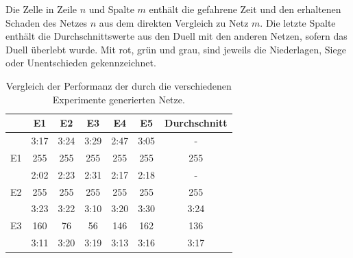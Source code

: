 \documentclass[11pt,final,journal,a4paper,towside,towcolumn]{IEEEtran}
\begin{document}
\begin{table}
	\caption{Vergleich der Performanz der durch die verschiedenen Experimente generierten Netze.}{Die Zelle in Zeile $n$ und Spalte $m$ enthält die gefahrene Zeit und den erhaltenen Schaden des Netzes $n$ aus dem direkten Vergleich zu Netz $m$. Die letzte Spalte enthält die Durchschnittswerte aus den Duell mit den anderen Netzen, sofern das Duell überlebt wurde. Mit rot, grün und grau, sind jeweils die Niederlagen, Siege oder Unentschieden gekennzeichnet.}
	\label{tab:turnier}
	\centering
	\begin{tabular}{|c|c|c|c|c|c|c|}
		\hline
		& E1                                                   & E2                            & E3                            & E4                            & E5                            & Durchschnitt \\ \hline
		& \cellcolor[HTML]{C0C0C0} 3:17 & \cellcolor[HTML]{C0C0C0}3:24 & \cellcolor[HTML]{FFCCC9}3:29 & \cellcolor[HTML]{FFCCC9}2:47 & \cellcolor[HTML]{FFCCC9}3:05 & \cellcolor[HTML]{C0C0C0}-       \\ \cline{2-7} 
		\multirow{-2}{*}{E1} & \cellcolor[HTML]{C0C0C0}255 & \cellcolor[HTML]{C0C0C0}255  & \cellcolor[HTML]{FFCCC9}255  & \cellcolor[HTML]{FFCCC9}255  & \cellcolor[HTML]{FFCCC9}255  & \cellcolor[HTML]{C0C0C0}255     \\ \hline
		& \cellcolor[HTML]{C0C0C0}2:02                        & \cellcolor[HTML]{C0C0C0}2:23 & \cellcolor[HTML]{FFCCC9}2:31 & \cellcolor[HTML]{FFCCC9}2:17 & \cellcolor[HTML]{FFCCC9}2:18 & \cellcolor[HTML]{C0C0C0}-       \\ \cline{2-7} 
		\multirow{-2}{*}{E2} & \cellcolor[HTML]{C0C0C0}255                         & \cellcolor[HTML]{C0C0C0}255  & \cellcolor[HTML]{FFCCC9}255  & \cellcolor[HTML]{FFCCC9}255  & \cellcolor[HTML]{FFCCC9}255  & \cellcolor[HTML]{C0C0C0}255     \\ \hline
		& \cellcolor[HTML]{9AFF99}3:23                        & \cellcolor[HTML]{9AFF99}3:22 & \cellcolor[HTML]{C0C0C0}3:10 & \cellcolor[HTML]{FFCCC9}3:20 & \cellcolor[HTML]{FFCCC9}3:30 & \cellcolor[HTML]{C0C0C0}3:24    \\ \cline{2-7} 
		\multirow{-2}{*}{E3} & \cellcolor[HTML]{9AFF99}160                         & \cellcolor[HTML]{9AFF99}76   & \cellcolor[HTML]{C0C0C0}56   & \cellcolor[HTML]{FFCCC9}146  & \cellcolor[HTML]{FFCCC9}162  & \cellcolor[HTML]{C0C0C0}136     \\ \hline
		& \cellcolor[HTML]{9AFF99}3:11                        & \cellcolor[HTML]{9AFF99}3:20 & \cellcolor[HTML]{9AFF99}3:19 & \cellcolor[HTML]{C0C0C0}3:13 & \cellcolor[HTML]{9AFF99}3:16 & \cellcolor[HTML]{9AFF99}3:17    \\ \cline{2-7} 

\end{tabular}
\end{table}
\end{document}
